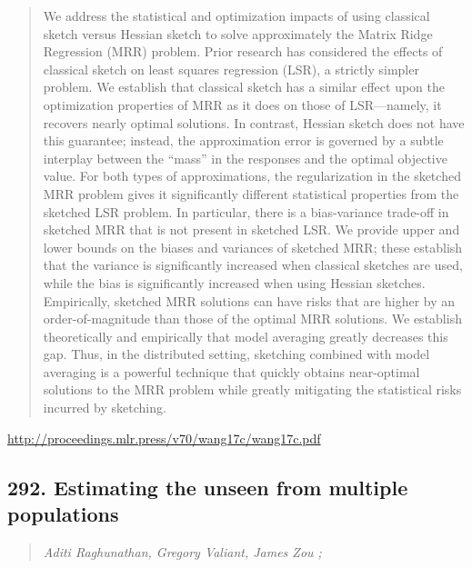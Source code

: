 \documentclass{article}
\begin{document}
\begin{quote}
    We address the statistical and optimization impacts of using classical sketch versus Hessian sketch to solve approximately the Matrix Ridge Regression (MRR) problem. Prior research has considered the effects of classical sketch on least squares regression (LSR), a strictly simpler problem. We establish that classical sketch has a similar effect upon the optimization properties of MRR as it does on those of LSR—namely, it recovers nearly optimal solutions. In contrast, Hessian sketch does not have this guarantee; instead, the approximation error is governed by a subtle interplay between the “mass” in the responses and the optimal objective value. For both types of approximations, the regularization in the sketched MRR problem gives it significantly different statistical properties from the sketched LSR problem. In particular, there is a bias-variance trade-off in sketched MRR that is not present in sketched LSR. We provide upper and lower bounds on the biases and variances of sketched MRR; these establish that the variance is significantly increased when classical sketches are used, while the bias is significantly increased when using Hessian sketches. Empirically, sketched MRR solutions can have risks that are higher by an order-of-magnitude than those of the optimal MRR solutions. We establish theoretically and empirically that model averaging greatly decreases this gap. Thus, in the distributed setting, sketching combined with model averaging is a powerful technique that quickly obtains near-optimal solutions to the MRR problem while greatly mitigating the statistical risks incurred by sketching.  \end{quote}

\href{http://proceedings.mlr.press/v70/wang17c/wang17c.pdf}{http://proceedings.mlr.press/v70/wang17c/wang17c.pdf}

\subsection{292. Estimating the unseen from multiple populations}

\begin{quote}
\footnotesize{\textit{Aditi Raghunathan, Gregory Valiant, James Zou ;}}
\end{quote}
\end{document}
